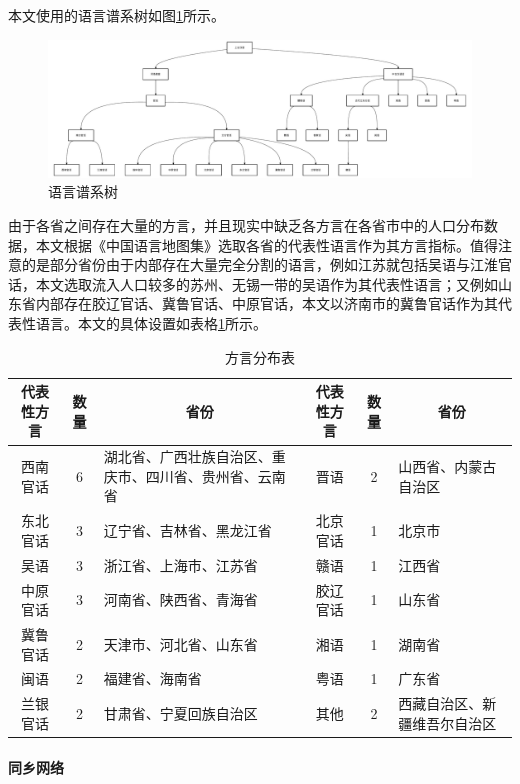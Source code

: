 \documentclass[
  a4paper,
  zihao=-4,
  fontset=mac,
  AutoFakeBold,
  AutoFakeSlant,
  oneside]{ctexbook}
\begin{document}
本文使用的语言谱系树如图\ref{fig:linguistic_tree}所示。
\begin{figure}[!ht]
\centering
\caption{语言谱系树}
\label{fig:linguistic_tree}
\includegraphics[width=\textwidth]{images/linguisitc_tree.drawio.pdf}
\end{figure}
由于各省之间存在大量的方言，并且现实中缺乏各方言在各省市中的人口分布数据，本文根据《中国语言地图集》选取各省的代表性语言作为其方言指标。值得注意的是部分省份由于内部存在大量完全分割的语言，例如江苏就包括吴语与江淮官话，本文选取流入人口较多的苏州、无锡一带的吴语作为其代表性语言；又例如山东省内部存在胶辽官话、冀鲁官话、中原官话，本文以济南市的冀鲁官话作为其代表性语言。本文的具体设置如表格\ref{tab:方言分布表}所示。




\begin{table}[!ht]
\centering
\caption{方言分布表}
\begin{tabularx}{\textwidth}{@{}ccXccX@{}}
\toprule
\textbf{代表性方言} & \textbf{数量} & \multicolumn{1}{c}{\textbf{省份}} & \textbf{代表性方言} &\textbf{数量}  & \multicolumn{1}{c}{\textbf{省份}}\\
\midrule
西南官话 & 6 & 湖北省、广西壮族自治区、重庆市、四川省、贵州省、云南省 &晋语 & 2 &山西省、内蒙古自治区\\
东北官话 & 3 &辽宁省、吉林省、黑龙江省 & 北京官话  &1 &北京市\\
吴语 & 3 &浙江省、上海市、江苏省& 赣语  &1 &江西省\\
中原官话 & 3 &河南省、陕西省、青海省 &胶辽官话  &1& 山东省\\
冀鲁官话 & 2 &天津市、河北省、山东省 &湘语  &1 &湖南省\\
闽语 & 2 &福建省、海南省 &粤语  &1& 广东省\\
兰银官话 & 2 &甘肃省、宁夏回族自治区 &其他  &2& 西藏自治区、新疆维吾尔自治区\\
\bottomrule
\end{tabularx}
\label{tab:方言分布表}
\end{table}



\paragraph{同乡网络}
\end{document}
